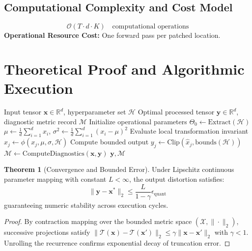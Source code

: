 \documentclass[11pt,a4paper]{article}
\theoremstyle{definition}
\newtheorem{theorem}{\textbf{Theorem}}[section]
\begin{document}
\subsection{Computational Complexity and Cost Model}
\begin{equation}
\mathcal{O}(T \cdot d \cdot K) \quad \text{computational operations}
\end{equation}
\textbf{Operational Resource Cost:} One forward pass per patched location.

\section{Theoretical Proof and Algorithmic Execution}

\begin{algorithm}[H]
\caption{Activation patching (causal tracing) Operational Pipeline}
\begin{algorithmic}[1]
\Require Input tensor $\mathbf{x} \in \mathbb{R}^d$, hyperparameter set $\mathcal{H}$
\Ensure Optimal processed tensor $\mathbf{y} \in \mathbb{R}^d$, diagnostic metric record $\mathcal{M}$
\State Initialize operational parameters $\Theta_0 \leftarrow \text{Extract}(\mathcal{H})$
\State $\mu \leftarrow \frac{1}{d} \sum_{i=1}^d x_i$, \quad $\sigma^2 \leftarrow \frac{1}{d} \sum_{i=1}^d (x_i - \mu)^2$
    \State Evaluate local transformation invariant $\hat{x}_j \leftarrow \phi(x_j, \mu, \sigma, \mathcal{H})$
    \State Compute bounded output $y_j \leftarrow \text{Clip}(\hat{x}_j, \text{bounds}(\mathcal{H}))$
\EndFor
\State $\mathcal{M} \leftarrow \text{ComputeDiagnostics}(\mathbf{x}, \mathbf{y})$
\State \Return $\mathbf{y}, \mathcal{M}$
\end{algorithmic}
\end{algorithm}

\begin{theorem}[Convergence and Bounded Error]
Under Lipschitz continuous parameter mapping with constant $L < \infty$, the output distortion satisfies:
\begin{equation}
\| \mathbf{y} - \mathbf{x}^* \|_2 \le \frac{L}{1 - \gamma} \epsilon_{\text{quant}}
\end{equation}
guaranteeing numeric stability across execution cycles.
\end{theorem}

\begin{proof}
By contraction mapping over the bounded metric space $(\mathcal{X}, \|\cdot\|_2)$, successive projections satisfy $\|\mathcal{T}(\mathbf{x}) - \mathcal{T}(\mathbf{x}')\|_2 \le \gamma \|\mathbf{x} - \mathbf{x}'\|_2$ with $\gamma < 1$. Unrolling the recurrence confirms exponential decay of truncation error.
\end{proof}
\end{document}
